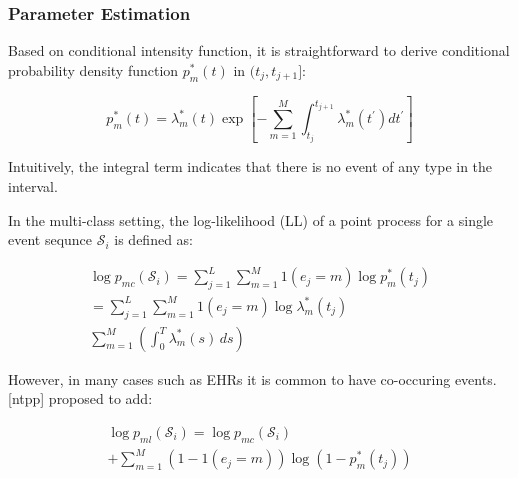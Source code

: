 \documentclass[journal,twoside,web]{ieeecolor}
\begin{document}
\subsubsection*{Parameter Estimation}

Based on conditional intensity function, it is straightforward to derive conditional probability density function $p^{*}_{m}(t)$ in $(t_j, t_{j+1}]$:

\begin{equation} 
    p_m^{*}(t)=\lambda_m^{*}(t) \exp \left[-\sum_{m=1}^{M} \int_{t_j}^{t_{j+1}}\lambda_m^{*}(t^{\prime})dt^{\prime}\right]
 \end{equation}
 
 Intuitively, the integral term indicates that there is no event of any type in the interval.

In the multi-class setting, the log-likelihood (LL) of a point process for a single event sequnce $\mathcal{S}_{i}$ is defined as:

\begin{multline} 
    \log p_{mc}(\mathcal{S}_{i})  =  \sum_{j = 1}^{L}\sum_{m = 1}^{M} 1(e_j=m)   \log p_m^{*}(t_j) \\   
    = \sum_{j = 1}^{L}\sum_{m = 1}^{M} 1(e_j=m)   \log \lambda_m^{*}(t_j)\\
    \sum_{m = 1}^{M} \left(   \int_{0}^{T}  \lambda_m^{*}(s) \,ds  \right)
\end{multline} 

However, in many cases such as EHRs it is common to have co-occuring events. [ntpp] proposed to add:





\begin{multline} 
    \log p_{ml}(\mathcal{S}_{i}) = \log p_{mc}(\mathcal{S}_{i}) \\
    + \sum_{m = 1}^{M} (1-1(e_j=m)) \log \left(1-p_m^{*}(t_j)  \right)
\end{multline} 


\end{document}
